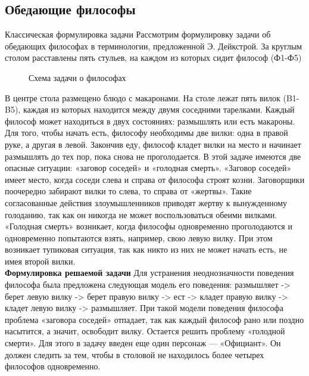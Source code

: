 \documentclass[a4paper]{article}
\begin{document}
\subsection{Обедающие философы}
Классическая формулировка задачи
Рассмотрим формулировку задачи об обедающих философах в терминологии, предложенной Э. Дейкстрой. За круглым столом расставлены пять стульев, на каждом из которых сидит философ (Ф1-Ф5) 
	\begin{figure}[h!]
		\caption{Схема задачи о философах}
		\label{img:phi}
	\end{figure}
В центре стола размещено блюдо с макаронами. На столе лежат пять вилок (B1-B5), каждая из которых находится между двумя соседними тарелками. Каждый философ может находиться в двух состояниях: размышлять или есть макароны. Для того, чтобы начать есть, философу необходимы две вилки: одна в правой руке, а другая в левой. Закончив еду, философ кладет вилки на место и начинает размышлять до тех пор, пока снова не проголодается.
В этой задаче имеются две опасные ситуации: «заговор соседей» и «голодная смерть». 
«Заговор соседей» имеет место, когда соседи слева и справа от философа строят козни. Заговорщики поочередно забирают вилки то слева, то справа от «жертвы». Такие согласованные действия злоумышленников приводят жертву к вынужденному голоданию, так как он никогда не может воспользоваться обеими вилками.
«Голодная смерть» возникает, когда философы одновременно проголодаются и одновременно попытаются взять, например, свою левую вилку. При этом возникает тупиковая ситуация, так как никто из них не может начать есть, не имея второй вилки.\\

\textbf{Формулировка решаемой задачи}
Для устранения неоднозначности поведения философа была предложена следующая
модель его поведения:
размышляет -> берет левую вилку -> берет правую вилку -> ест -> кладет правую вилку -> кладет левую вилку -> размышляет.
При такой модели поведения философа проблема «заговора соседей» отпадает, так как каждый философ рано или поздно насытится, а значит, освободит вилку. Остается решить проблему «голодной смерти». Для этого в задачу введен еще один персонаж — «Официант». Он должен следить за тем, чтобы в столовой не находилось более четырех философов одновременно.
\end{document}
